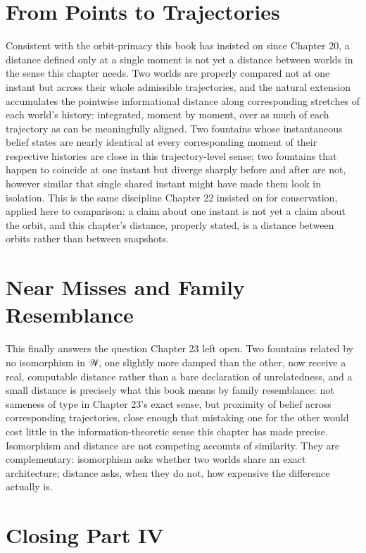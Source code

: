 \section{From Points to Trajectories}

Consistent with the orbit-primacy this book has insisted on since Chapter 20, a distance defined only at a single moment is not yet a distance between worlds in the sense this chapter needs. Two worlds are properly compared not at one instant but across their whole admissible trajectories, and the natural extension accumulates the pointwise informational distance along corresponding stretches of each world's history: integrated, moment by moment, over as much of each trajectory as can be meaningfully aligned. Two fountains whose instantaneous belief states are nearly identical at every corresponding moment of their respective histories are close in this trajectory-level sense; two fountains that happen to coincide at one instant but diverge sharply before and after are not, however similar that single shared instant might have made them look in isolation. This is the same discipline Chapter 22 insisted on for conservation, applied here to comparison: a claim about one instant is not yet a claim about the orbit, and this chapter's distance, properly stated, is a distance between orbits rather than between snapshots.

\section{Near Misses and Family Resemblance}

This finally answers the question Chapter 23 left open. Two fountains related by no isomorphism in 𝒲, one slightly more damped than the other, now receive a real, computable distance rather than a bare declaration of unrelatedness, and a small distance is precisely what this book means by family resemblance: not sameness of type in Chapter 23's exact sense, but proximity of belief across corresponding trajectories, close enough that mistaking one for the other would cost little in the information-theoretic sense this chapter has made precise. Isomorphism and distance are not competing accounts of similarity. They are complementary: isomorphism asks whether two worlds share an exact architecture; distance asks, when they do not, how expensive the difference actually is.

\section{Closing Part IV}

